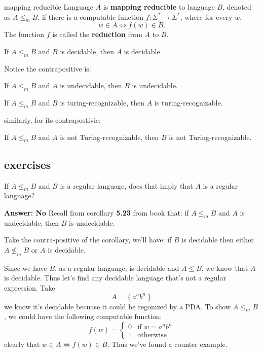 \documentclass[a4paper]{article}
\begin{document}
\begin{Definition}{mapping reducible}{}
	Language $A$ is  \textbf{mapping reducible} to language $B$, denoted as  $A \le_m B$, if there is a computable function $f: \Sigma^* \to \Sigma^*$, where for every $w$,  \[
	w \in A \Longleftrightarrow f(w) \in B .
	\]  The function $f$ is called the  \textbf{reduction} from $A$ to  $B$. 
\end{Definition}

\begin{Theorem}{}{}
	If $A \le_m B$ and $B$ is decidable, then  $A$ is decidable.
\end{Theorem}

Notice the contrapositive is:

\begin{Corollary}{}{}
	If $A  \le_m B$ and $A$ is undecidable, then  $B$ is undecidable.
\end{Corollary}

\begin{Theorem}{}{}
	If $A \le_m B$ and $B$ is turing-recognizable, then  $A$ is turing-recognizable.
\end{Theorem}

similarly, for its contrapostivie:

\begin{Corollary}{}{}
	If $A \le_m B$ and $A$ is not Turing-recognizable, then  $B$ is not Turing-recognizable.
\end{Corollary}

\newpage
\subsection{exercises}

\begin{tcolorbox}[enhanced,breakable,colback=white]
If $A\le_m B$ and $B$ is a regular language, does that imply that  $A$ is a regular language?
\end{tcolorbox}
\textbf{Answer: No}
Recall from corollary \textbf{5.23} from book that: if $A\le_m B$ and $A$ is undecidable, then  $B$ is undecidable.

Take the contra-positive of the corollary, we'll have: if  $B$ is decidable then either  $A \nleq_m B$ or $A$ is decidable.

Since we have  $B$, as a regular language, is decidable and  $A \le B$, we know that $A$ is decidable. Thus let's find any decidable language that's not a regular expression. Take \[
A = \left\{ a^n b^n \right\} 
\] we know it's decidable becuase it could be regonized by a PDA. To show $ A \le_m B$, we could have the following computable function: \[
f(w) = \begin{cases}
	0 & \text{if } w = a^n b^n \\
	1 & \text{otherwise}
\end{cases}
\] clearly that $ w \in A \Longleftrightarrow f(w) \in B$. Thus we've found a counter example.
\end{document}
